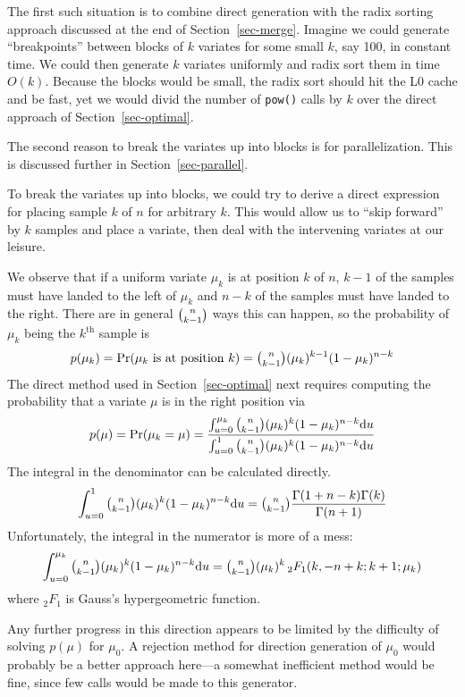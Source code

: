 \documentclass[12pt]{article}
\newcommand{\hyperg}{{{{}_2}{F_1}}}
\newcommand{\du}{{\text{d}u}}
\begin{document}
  The first such situation is to combine direct generation
  with the radix sorting approach discussed at the end of
  Section~\ref{sec-merge}.  Imagine we could generate
  ``breakpoints'' between blocks of $k$ variates for some
  small $k$, say 100, in constant time.  We could then
  generate $k$ variates uniformly and radix sort them in
  time $O(k)$.  Because the blocks would be small, the radix
  sort should hit the L0 cache and be fast, yet we would
  divid the number of {\tt pow()} calls by $k$ over the
  direct approach of Section~\ref{sec-optimal}.

  The second reason to break the variates up into blocks is
  for parallelization.  This is discussed further in
  Section~\ref{sec-parallel}.

  To break the variates up into blocks, we could try to
  derive a direct expression for placing sample $k$ of $n$
  for arbitrary $k$.  This would allow us to ``skip forward''
  by $k$ samples and place a variate, then deal with the
  intervening variates at our leisure.

  We observe that if a uniform variate $\mu_k$ is at
  position $k$ of $n$, $k - 1$ of the samples must have landed to the
  left of $\mu_k$ and $n - k$ of the samples must have
  landed to the right.  There are in general $\tbinom{n}{k-1}$
  ways this can happen, so the probability of $\mu_k$ being
  the $k^{\text{th}}$ sample is $$
    p(\mu_k) = \text{Pr}(\mu_k\text{ is at position }k) =
         \tbinom{n}{k - 1}(\mu_k)^{k-1}(1-\mu_k)^{n - k}
  $$
  The direct method used in Section~\ref{sec-optimal}
  next requires computing the probability that a variate
  $\mu$ is in the right position via $$
    p(\mu) = \text{Pr}(\mu_k = \mu) =
      \frac{\int_{u=0}^{\mu_k}{\tbinom{n}{k - 1}(\mu_k)^k(1-\mu_k)^{n - k}}\du}
           {\int_{u=0}^{1}{\tbinom{n}{k - 1}(\mu_k)^k(1-\mu_k)^{n - k}}\du}
  $$
  The integral in the denominator can be calculated
  directly. $$
    \int_{u=0}^{1}{\tbinom{n}{k - 1}(\mu_k)^k(1-\mu_k)^{n - k}}\du = 
        \tbinom{n}{k - 1}\frac{\Gamma(1 + n - k)\Gamma(k)}{\Gamma(n + 1)}
  $$
  Unfortunately, the integral in the numerator is more of a
  mess: $$
    \int_{u=0}^{\mu_k}{\tbinom{n}{k - 1}(\mu_k)^k(1-\mu_k)^{n - k}}\du =
        \tbinom{n}{k - 1}(\mu_k)^k\,\hyperg(k, -n + k; k + 1; \mu_k)
  $$
  where $\hyperg$ is Gauss's hypergeometric function.

  Any further progress in this direction appears to be
  limited by the difficulty of solving $p(\mu)$
  for $\mu_0$.  A rejection method for direction generation
  of $\mu_0$ would probably be a better approach here---a
  somewhat inefficient method would be fine, since few calls
  would be made to this generator.
  
\end{document}
